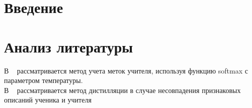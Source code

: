 \newpage


\section{Введение}


\section{Анализ литературы}

В ~\cite{Hinton2015} рассматривается метод учета меток учителя, используя функцию softmax с параметром температуры.\\
В ~\cite{Vapnik2016} рассматривается метод дистилляции в случае несовпадения признаковых описаний ученика и учителя\\